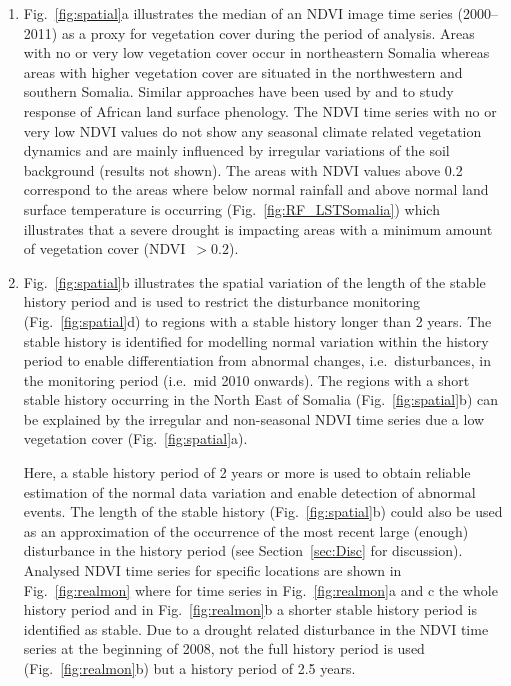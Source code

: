 \documentclass[authoryear,preprint,review,10pt]{elsarticle}
\begin{document}
\begin{enumerate}[(1)]

\item Fig.~\ref{fig:spatial}a illustrates the median of an NDVI image time series (2000--2011) as a proxy for vegetation cover during the period of analysis. Areas with no or very low vegetation cover occur in northeastern Somalia whereas areas with higher vegetation cover are situated in the northwestern and southern Somalia. Similar approaches have been used by \citet{Brown:2010fq} and \citet{Vrieling:2011da} to study response of African land surface phenology. The NDVI time series with no or very low NDVI values do not show any seasonal climate related vegetation dynamics and are mainly influenced by irregular variations of the soil background (results not shown). The areas with NDVI values above 0.2 correspond to the areas where below normal rainfall and above normal land surface temperature is occurring (Fig.~\ref{fig:RF_LSTSomalia}) which illustrates that a severe drought is impacting areas with a minimum amount of vegetation cover (NDVI~$> 0.2$). 

\item Fig.~\ref{fig:spatial}b illustrates the spatial variation of the length of the stable history period and is used to restrict the disturbance monitoring (Fig.~\ref{fig:spatial}d) to regions with a stable history longer than 2 years. The stable history is identified for modelling normal variation within the history period to enable differentiation from abnormal changes, i.e.\ disturbances, in the monitoring period (i.e.\ mid 2010 onwards). The regions with a short stable history occurring in the North East of Somalia (Fig.~\ref{fig:spatial}b) can be explained by the irregular and non-seasonal NDVI time series due a low vegetation cover (Fig.~\ref{fig:spatial}a).  

Here, a stable history period of 2 years or more is used to obtain reliable estimation of the normal data variation and enable detection of abnormal events. The length of the stable history (Fig.~\ref{fig:spatial}b) could also be used as an approximation of the occurrence of the most recent large (enough) disturbance in the history period (see Section~\ref{sec:Disc} for discussion). Analysed NDVI time series for specific locations are shown in Fig.~\ref{fig:realmon} where for time series in Fig.~\ref{fig:realmon}a and c the whole history period and in Fig.~\ref{fig:realmon}b a shorter stable history period is identified as stable. Due to a drought related disturbance in the NDVI time series at the beginning of 2008, not the full history period is used (Fig.~\ref{fig:realmon}b) but a history period of 2.5 years. 

\end{enumerate}
\end{document}
